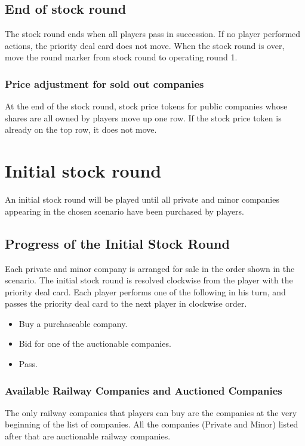 \documentclass{article}
\begin{document}
\begin{CJK}{UTF8}{min}
\begin{multicols}{2}
\subsection{End of stock round} \label{sr-end-of-sr}
The stock round ends when all players pass in succession. If no
player performed actions, the priority deal card does not move. When
the stock round is over, move the round marker from stock round to
operating round 1.

\subsubsection{Price adjustment for sold out companies}
\label{sr-sold-out}
At the end of the stock round, stock price tokens for public companies
whose shares are all owned by players move up one
row. If the stock price token is already on the top row, it does not move.


\section{Initial stock round}\label{isr}
An initial stock round will be played until all private and minor
companies appearing in the chosen scenario have been purchased by
players.

\subsection{Progress of the Initial Stock Round}
Each private and minor company is arranged for sale in the order shown in the
scenario. The initial stock round is resolved clockwise from the
player with the priority deal card. Each player performs one
of the following in his turn, and passes the priority deal
card to the next player in clockwise order.

\begin{itemize}
\item Buy a purchaseable company.
\item Bid for one of the auctionable companies.
\item Pass.
\end{itemize}

\subsubsection{Available Railway Companies and Auctioned Companies}
The only railway companies that players can buy are the companies at
the very beginning of the list of companies. All the companies (Private and Minor) listed
after that are auctionable railway companies.


\end{multicols}
\end{CJK}
\end{document}
